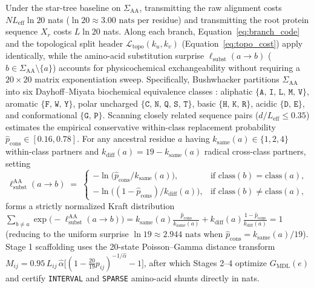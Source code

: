\documentclass[11pt,a4paper]{article}
\begin{document}
Under the star-tree baseline on $\Sigma_{\text{AA}}$, transmitting the raw alignment costs $N L_{\text{eff}} \ln 20$ nats ($\ln 20 \approx 3.00\text{ nats}$ per residue) and transmitting the root protein sequence $X_r$ costs $L \ln 20$ nats. Along each branch, Equation~\eqref{eq:branch_code} and the topological split header $\mathcal{L}_{\text{topo}}(k_u, k_v)$ (Equation~\eqref{eq:topo_cost}) apply identically, while the amino-acid substitution surprise $\ell_{\text{subst}}(a \to b)$ ($b \in \Sigma_{\text{AA}} \setminus \{a\}$) accounts for physicochemical exchangeability without requiring a $20 \times 20$ matrix exponentiation sweep. Specifically, Bushwhacker partitions $\Sigma_{\text{AA}}$ into six Dayhoff--Miyata biochemical equivalence classes \citep{dayhoff1978model}: aliphatic $\{\texttt{A, I, L, M, V}\}$, aromatic $\{\texttt{F, W, Y}\}$, polar uncharged $\{\texttt{C, N, Q, S, T}\}$, basic $\{\texttt{H, K, R}\}$, acidic $\{\texttt{D, E}\}$, and conformational $\{\texttt{G, P}\}$. Scanning closely related sequence pairs ($d / L_{\text{eff}} \le 0.35$) estimates the empirical conservative within-class replacement probability $\hat{p}_{\text{cons}} \in [0.16, 0.78]$. For any ancestral residue $a$ having $k_{\text{same}}(a) \in \{1, 2, 4\}$ within-class partners and $k_{\text{diff}}(a) = 19 - k_{\text{same}}(a)$ radical cross-class partners, setting
\begin{equation}
    \ell_{\text{subst}}^{\text{AA}}(a \to b) \;=\;
    \begin{cases}
        -\ln\!\big(\hat{p}_{\text{cons}} / k_{\text{same}}(a)\big), & \text{if } \text{class}(b) = \text{class}(a), \\[3pt]
        -\ln\!\big((1 - \hat{p}_{\text{cons}}) / k_{\text{diff}}(a)\big), & \text{if } \text{class}(b) \neq \text{class}(a),
    \end{cases}
    \label{eq:aa_subst}
\end{equation}
forms a strictly normalized Kraft distribution $\sum_{b \neq a} \exp\!\big(-\ell_{\text{subst}}^{\text{AA}}(a \to b)\big) = k_{\text{same}}(a)\frac{\hat{p}_{\text{cons}}}{k_{\text{same}}(a)} + k_{\text{diff}}(a)\frac{1 - \hat{p}_{\text{cons}}}{k_{\text{diff}}(a)} = 1$ (reducing to the uniform surprise $\ln 19 \approx 2.944\text{ nats}$ when $\hat{p}_{\text{cons}} = k_{\text{same}}(a)/19$). Stage 1 scaffolding uses the 20-state Poisson--Gamma distance transform $M_{ij} = 0.95\,L_{ij}\,\hat{\alpha}\big[(1 - \frac{20}{19}p_{ij})^{-1/\hat{\alpha}} - 1\big]$, after which Stages 2--4 optimize $G_{\text{MDL}}(e)$ and certify \texttt{INTERVAL} and \texttt{SPARSE} amino-acid shunts directly in nats.
\end{document}
